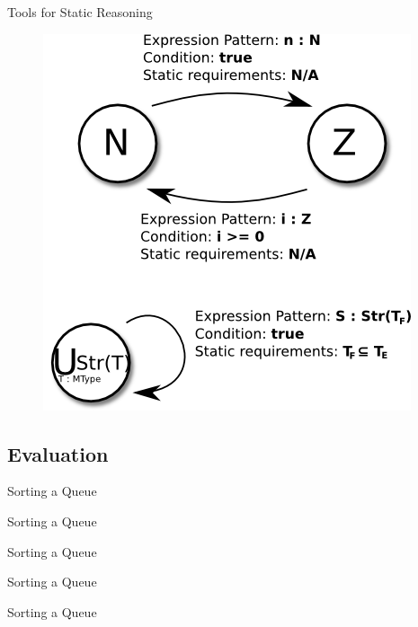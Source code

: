 \begin{frame}{Tools for Static Reasoning}
	\begin{figure}
		\centering
		\includegraphics[width=.6\textwidth]{../typeGraph.png}
	\end{figure}
\end{frame}


\subsection{Evaluation}
\begin{frame}{Sorting a Queue}
	
\end{frame}

\begin{frame}{Sorting a Queue}
	
\end{frame}

\begin{frame}{Sorting a Queue}
	
\end{frame}

\begin{frame}{Sorting a Queue}
	
\end{frame}

\begin{frame}{Sorting a Queue}
	
\end{frame}

